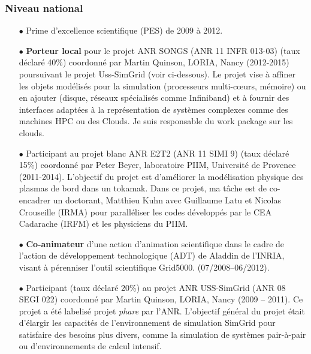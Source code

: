 \subsubsection{Niveau national}
\begin{itemize}

\item[$\bullet$] Prime d'excellence scientifique (PES) de 2009 à 2012.\\


\item[$\bullet$]
\textbf{Porteur local} pour le projet ANR SONGS (ANR 11 INFR 013-03)  (taux déclaré 40\%)
coordonné par Martin Quinson, LORIA, Nancy (2012-2015)  poursuivant le projet 
Uss-SimGrid (voir ci-dessous). Le projet vise à affiner les objets modélisés pour la 
simulation (processeurs multi-c{\oe}urs, mémoire) ou en ajouter (disque, réseaux spécialisés
comme Infiniband) et à fournir des interfaces adaptées à la représentation de systèmes
complexes comme des machines HPC ou des Clouds. Je suis responsable du work package
sur les clouds.\\


\item[$\bullet$]
Participant au projet blanc ANR E2T2 (ANR 11 SIMI 9) (taux déclaré 15\%) coordonné par 
Peter Beyer, laboratoire PIIM, Université de Provence (2011-2014). L'objectif du projet 
est d'améliorer la modélisation physique des plasmas de bord dans un tokamak. Dans ce
projet, ma tâche est de co-encadrer un doctorant, Matthieu Kuhn avec Guillaume Latu et
Nicolas Crouseille (IRMA) pour paralléliser les codes développés par le CEA Cadarache 
(IRFM) et les physiciens du PIIM. \\


\item[$\bullet$]
\textbf{Co-animateur} d'une action d'animation scientifique 
dans le cadre de l'action de développement technologique (ADT) de Aladdin de l'INRIA, 
visant à pérenniser l'outil scientifique Grid5000. (07/2008--06/2012).\\


\item[$\bullet$]
Participant (taux déclaré 20\%) au projet ANR USS-SimGrid (ANR 08 SEGI 022) coordonné par 
Martin Quinson, LORIA, Nancy (2009 -- 2011). Ce projet a été labelisé projet \textit{phare}
par l'ANR.
L'objectif général du projet était  d'élargir les capacités 
de l'environnement de simulation SimGrid pour satisfaire des besoins plus divers, comme la
simulation de systèmes pair-à-pair ou d'environnements de calcul intensif.\\



\end{itemize}
